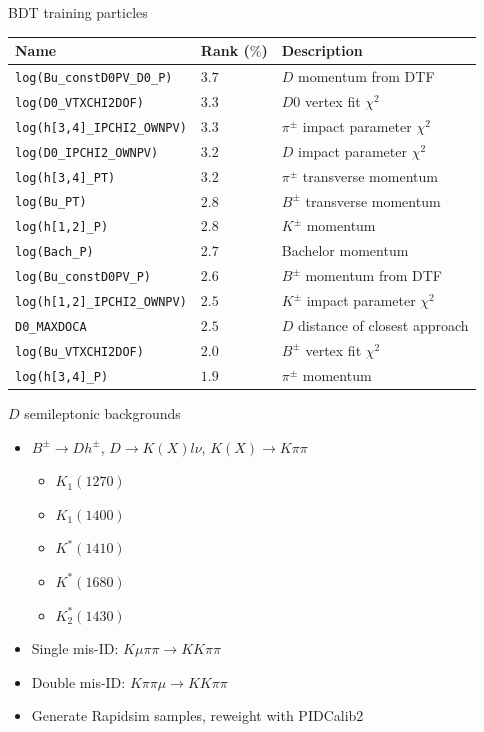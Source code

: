 \documentclass{beamer}
\begin{document}
\begin{frame}{BDT training particles}
  \centering
  \begin{tabular}{|l|l|l|}
    \hline
    Name & Rank ($\%$) & Description \\
    \hline
    \texttt{log(Bu\_constD0PV\_D0\_P)} & $3.7$ & $D$ momentum from DTF \\
    \texttt{log(D0\_VTXCHI2DOF)} & $3.3$ & $D0$ vertex fit $\chi^2$ \\
    \texttt{log(h[3,4]\_IPCHI2\_OWNPV)} & $3.3$ & $\pi^\pm$ impact parameter $\chi^2$ \\
    \texttt{log(D0\_IPCHI2\_OWNPV)} & $3.2$ & $D$ impact parameter $\chi^2$ \\
    \texttt{log(h[3,4]\_PT)} & $3.2$ & $\pi^\pm$ transverse momentum \\
    \texttt{log(Bu\_PT)} & $2.8$ & $B^\pm$ transverse momentum \\
    \texttt{log(h[1,2]\_P)} & $2.8$ & $K^\pm$ momentum \\
    \texttt{log(Bach\_P)} & $2.7$ & Bachelor momentum \\
    \texttt{log(Bu\_constD0PV\_P)} & $2.6$ & $B^\pm$ momentum from DTF \\
    \texttt{log(h[1,2]\_IPCHI2\_OWNPV)} & $2.5$ & $K^\pm$ impact parameter $\chi^2$ \\
    \texttt{D0\_MAXDOCA} & $2.5$ & $D$ distance of closest approach \\
    \texttt{log(Bu\_VTXCHI2DOF)} & $2.0$ & $B^\pm$ vertex fit $\chi^2$ \\
    \texttt{log(h[3,4]\_P)} & $1.9$ & $\pi^\pm$ momentum \\
    \hline
  \end{tabular}
\end{frame}

\begin{frame}{$D$ semileptonic backgrounds}
  \begin{itemize}
    \setlength\itemsep{1em}
    \item{$B^\pm\to Dh^\pm$, $D\to K(X)l\nu$, $K(X)\to K\pi\pi$}
    \begin{itemize}
      \item{$K_1(1270)$}
      \item{$K_1(1400)$}
      \item{$K^*(1410)$}
      \item{$K^*(1680)$}
      \item{$K_2^*(1430)$}
    \end{itemize}
    \item{Single mis-ID: $K\mu\pi\pi\to KK\pi\pi$}
    \item{Double mis-ID: $K\pi\pi\mu\to KK\pi\pi$}
    \item{Generate Rapidsim samples, reweight with PIDCalib2}
  \end{itemize}
\end{frame}
\end{document}
